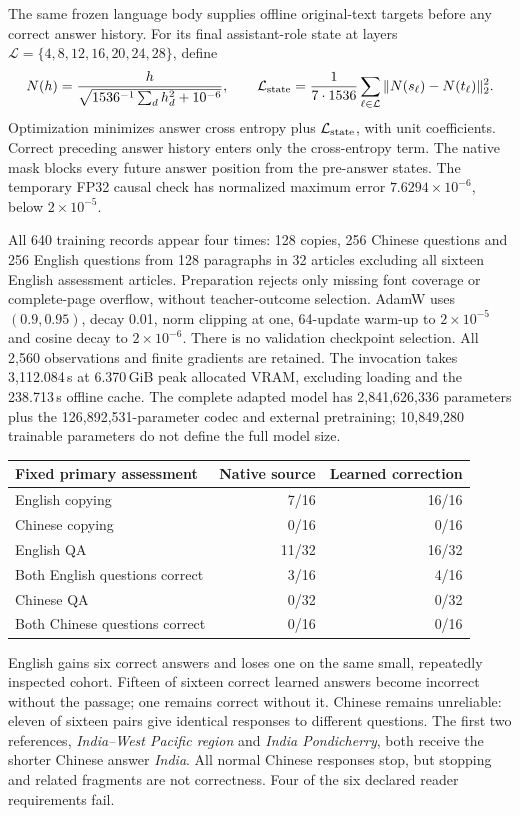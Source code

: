 \documentclass[10pt,a4paper]{article}
\begin{document}
The same frozen language body supplies offline original-text targets before
any correct answer history. For its final assistant-role state at layers
$\mathcal L=\{4,8,12,16,20,24,28\}$, define
\[
 N(h)=\frac{h}{\sqrt{1536^{-1}\sum_d h_d^2+10^{-6}}},\qquad
 \mathcal L_{\rm state}=\frac{1}{7\cdot1536}
 \sum_{\ell\in\mathcal L}\|N(s_\ell)-N(t_\ell)\|_2^2.
\]
Optimization minimizes answer cross entropy plus $\mathcal L_{\rm state}$,
with unit coefficients. Correct preceding answer history enters only the
cross-entropy term. The native mask blocks every future answer position
from the pre-answer states. The temporary FP32 causal check has normalized
maximum error $7.6294\times10^{-6}$, below $2\times10^{-5}$.

All 640 training records appear four times: 128 copies, 256 Chinese questions
and 256 English questions from 128 paragraphs in 32 articles excluding all
sixteen English assessment articles. Preparation rejects only missing font
coverage or complete-page overflow, without teacher-outcome selection.
AdamW uses $(0.9,0.95)$, decay 0.01, norm clipping at one, 64-update warm-up
to $2\times10^{-5}$ and cosine decay to $2\times10^{-6}$. There is no
validation checkpoint selection. All 2,560 observations and finite gradients
are retained. The invocation takes 3,112.084\,s at 6.370\,GiB peak allocated
VRAM, excluding loading and the 238.713\,s offline cache. The complete adapted
model has 2,841,626,336 parameters plus the 126,892,531-parameter codec and
external pretraining; 10,849,280 trainable parameters do not define the full
model size.

\begin{center}\small
\begin{tabular}{lrr}
\toprule
Fixed primary assessment & Native source & Learned correction\\
\midrule
English copying & 7/16 & 16/16\\
Chinese copying & 0/16 & 0/16\\
English QA & 11/32 & 16/32\\
Both English questions correct & 3/16 & 4/16\\
Chinese QA & 0/32 & 0/32\\
Both Chinese questions correct & 0/16 & 0/16\\
\bottomrule
\end{tabular}
\end{center}
English gains six correct answers and loses one on the same small, repeatedly
inspected cohort. Fifteen of sixteen correct learned answers become incorrect
without the passage; one remains correct without it. Chinese remains
unreliable: eleven of sixteen pairs give identical responses to different
questions. The first two references, \emph{India--West Pacific region} and
\emph{India Pondicherry}, both receive the shorter Chinese answer \emph{India}.
All normal Chinese responses stop, but stopping and related fragments are
not correctness. Four of the six declared reader requirements fail.
\end{document}
